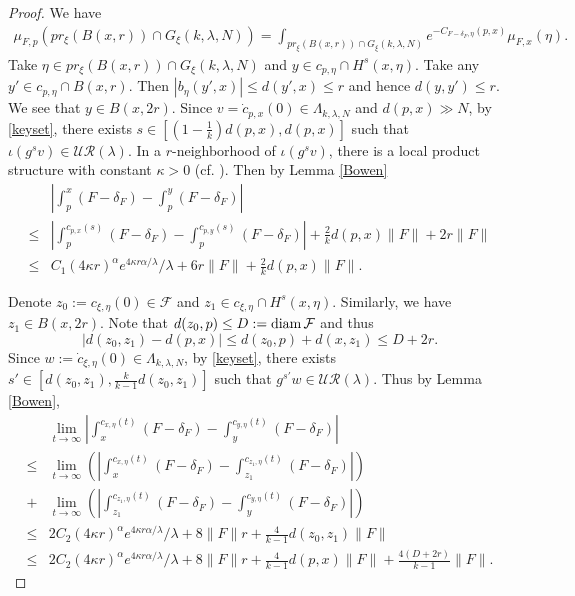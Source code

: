 \documentclass[11pt]{amsart}
\theoremstyle{definition}
\newcommand{\F}{\mathcal{F}}
\newcommand{\UR}{\mathcal{UR}}
\def\diam{\mathop{\hbox{{\rm diam}}}}
\def\diam{\mathop{\hbox{{\rm diam}}}}
\def\a{\alpha}
\def\d{\delta}   %
\def\l{\lambda}   \def\L{\Lambda}
\begin{document}
\begin{proof}
We have
\begin{equation}\label{e:alph1}
\begin{aligned}
\mu_{F,p}(pr_{\xi}(B(x,r))\cap G_\xi(k, \l, N))=\int_{pr_{\xi}(B(x,r))\cap G_\xi(k, \l, N)}e^{-C_{F-\d_F,\eta}(p,x)}\mu_{F,x}(\eta).
\end{aligned}
\end{equation}
Take $\eta \in pr_{\xi}(B(x,r))\cap  G_\xi(k, \l, N)$ and $y\in c_{p,\eta}\cap H^s(x,\eta).$ Take any $y'\in c_{p,\eta}\cap B(x,r)$. Then $|b_\eta(y',x)|\le d(y',x)\le r$ and hence $d(y,y')\le r$. We see that $y\in B(x,2r)$. Since $v=\dot{c}_{p,x}(0)\in  \L_{k,\l, N}$ and $d(p,x)\gg N$, by \eqref{keyset}, there exists $s\in [(1-\frac{1}{k})d(p,x), d(p,x)]$ such that
$\iota(g^sv)\in \UR(\l)$. In a $r$-neighborhood of $\iota(g^sv)$, there is a local product structure with constant $\kappa>0$ (cf. \cite[Lemma 4.4]{BCFT}). Then by Lemma \ref{Bowen}
\begin{equation}\label{up2}
\begin{aligned}
&\left|\int_p^x(F-\d_F)-\int_p^y(F-\d_F)\right|\\
\le& \left|\int_p^{c_{p,x}(s)}(F-\d_F)-\int_p^{c_{p,y}(s)}(F-\d_F)\right|+\frac{2}{k}d(p,x)\|F\|+2r\|F\|\\
\le &C_1(4\kappa r)^\a e^{4\kappa r\a/\lambda}/\l+6r\|F\|+\frac{2}{k}d(p,x)\|F\|.
\end{aligned}
\end{equation}

Denote $z_0:=c_{\xi,\eta}(0)\in \F$ and $z_1\in c_{\xi,\eta}\cap H^s(x,\eta)$. Similarly, we have $z_1\in B(x,2r)$. Note that $d(z_0,p)\le D:=\diam \F$ and thus 
$$|d(z_0,z_1)-d(p,x)|\le d(z_0,p)+d(x,z_1)\le D+2r.$$ 
Since $w:=\dot{c}_{\xi,\eta}(0)\in  \L_{k,\l, N}$, by \eqref{keyset}, there exists $s'\in [d(z_0,z_1), \frac{k}{k-1}d(z_0,z_1)]$ such that $g^{s'}w\in \UR(\l)$.
Thus by Lemma \ref{Bowen},
\begin{equation}\label{up1}
\begin{aligned}
&\lim_{t\to \infty}\left|\int_x^{c_{x,\eta}(t)}(F-\d_F)-\int_y^{c_{y,\eta}(t)}(F-\d_F)\right|\\
\le &\lim_{t\to \infty}\left(\left|\int_x^{c_{x,\eta}(t)}(F-\d_F)-\int_{z_1}^{c_{z_1,\eta}(t)}(F-\d_F)\right|\right)\\
+&\lim_{t\to \infty}\left(\left|\int_{z_1}^{c_{z_1,\eta}(t)}(F-\d_F)-\int_y^{c_{y,\eta}(t)}(F-\d_F)\right|\right)\\
\le &2C_2(4\kappa r)^\a e^{4\kappa r\a/\lambda}/\l+8\|F\|r+\frac{4}{k-1}d(z_0,z_1)\|F\|\\
\le &2C_2(4\kappa r)^\a e^{4\kappa r\a/\lambda}/\l+8\|F\|r+\frac{4}{k-1}d(p,x)\|F\|+\frac{4(D+2r)}{k-1}\|F\|.
\end{aligned}
\end{equation}


\end{proof}
\end{document}
